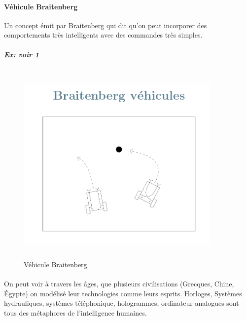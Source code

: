 \documentclass[oneside]{book}
\begin{document}
\paragraph{Véhicule Braitenberg}
Un concept émit par Braitenberg qui dit qu'on peut incorporer des comportements très intelligents avec des commandes très simples.
\subparagraph{Ex: voir \ref{fig:Braitenberg}}
	\begin{figure}[!ht]
		\centering
		\includegraphics[width=10cm, height=10cm, keepaspectratio]{Braitenberg.png}
		\caption{Véhicule Braitenberg.}
		\label{fig:Braitenberg}
	\end{figure}
\paragraph{}	
On peut voir à travers les âges, que plusieurs civilisations (Grecques, Chine, Égypte) on modélisé leur technologies comme leurs esprits. Horloges, Systèmes hydrauliques, systèmes téléphonique, hologrammes, ordinateur analogues sont tous des métaphores de l'intelligence humaines.
\end{document}
